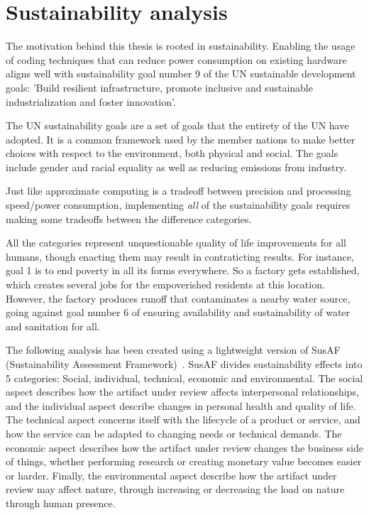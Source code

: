 \section{Sustainability analysis}
The motivation behind this thesis is rooted in sustainability. Enabling the usage of coding techniques that can reduce power consumption on existing hardware aligns well with sustainability goal number 9 of the UN sustainable development goals: 'Build resilient infrastructure, promote inclusive and sustainable industrialization and foster innovation'. 

The UN sustainability goals are a set of goals that the entirety of the UN have adopted. It is a common framework used by the member nations to make better choices with respect to the environment, both physical and social. The goals include gender and racial equality as well as reducing emissions from industry.

Just like approximate computing is a tradeoff between precision and processing speed/power consumption, implementing \emph{all} of the sustainability goals requires making some tradeoffs between the difference categories. 

All the categories represent unquestionable quality of life improvements for all humans, though enacting them may result in contraticting results. For instance, goal 1 is to end poverty in all its forms everywhere. So a factory gets established, which creates several jobs for the empoverished residents at this location. However, the factory produces runoff that contaminates a nearby water source, going against goal number 6 of ensuring availability and sustainability of water and sanitation for all. 

The following analysis has been created using a lightweight version of SusAF (Sustainability Assessment Framework)~\cite{SusAF_website}. SusAF divides sustainability effects into 5 categories: Social, individual, technical, economic and environmental. The social aspect describes how the artifact under review affects interpersonal relationships, and the individual aspect describe changes in personal health and quality of life. The technical aspect concerns itself with the lifecycle of a product or service, and how the service can be adapted to changing needs or technical demands. The economic aspect describes how the artifact under review changes the business side of things, whether performing research or creating monetary value becomes easier or harder. Finally, the environmental aspect describe how the artifact under review may affect nature, through increasing or decreasing the load on nature through human presence.

